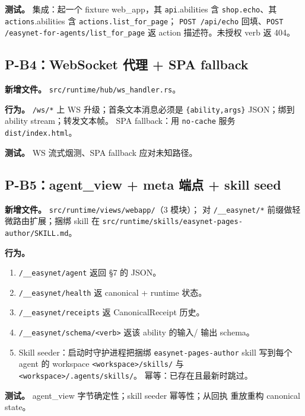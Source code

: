 \documentclass[11pt,a4paper]{article}
\theoremstyle{definition}
\begin{document}
\textbf{测试。} 集成：起一个 fixture web\_app，其
\texttt{api}.abilities 含 \texttt{shop.echo}、其
\texttt{actions}.abilities 含 \texttt{actions.list\_for\_page}；
\texttt{POST /api/echo} 回填、\texttt{POST /easynet-for-agents/list\_for\_page}
返 action 描述符。未授权 verb 返 404。

\subsection{P-B4：WebSocket 代理 + SPA fallback}

\textbf{新增文件。} \texttt{src/runtime/hub/ws\_handler.rs}。

\textbf{行为。} \texttt{/ws/*} 上 WS 升级；首条文本消息必须是
\texttt{\{ability,args\}} JSON；绑到 ability stream；转发文本帧。
SPA fallback：用 \texttt{no-cache} 服务 \texttt{dist/index.html}。

\textbf{测试。} WS 流式烟测、SPA fallback 应对未知路径。

\subsection{P-B5：agent\_view + meta 端点 + skill seed}

\textbf{新增文件。} \texttt{src/runtime/views/webapp/}（3 模块）；
对 \texttt{/\_\_easynet/*} 前缀做轻微路由扩展；捆绑 skill 在
\texttt{src/runtime/skills/easynet-pages-author/SKILL.md}。

\textbf{行为。}
\begin{enumerate}[leftmargin=2em,itemsep=0.1em]
    \item \texttt{/\_\_easynet/agent} 返回 \S7 的 JSON。
    \item \texttt{/\_\_easynet/health} 返 canonical + runtime 状态。
    \item \texttt{/\_\_easynet/receipts} 返 CanonicalReceipt 历史。
    \item \texttt{/\_\_easynet/schema/<verb>} 返该 ability 的输入/
    输出 schema。
    \item Skill seeder：启动时守护进程把捆绑
    \texttt{easynet-pages-author} skill 写到每个 agent 的 workspace
    \texttt{<workspace>/skills/} 与 \texttt{<workspace>/.agents/skills/}。
    幂等：已存在且最新时跳过。
\end{enumerate}

\textbf{测试。} agent\_view 字节确定性；skill seeder 幂等性；从回执
重放重构 canonical state。

\end{document}
